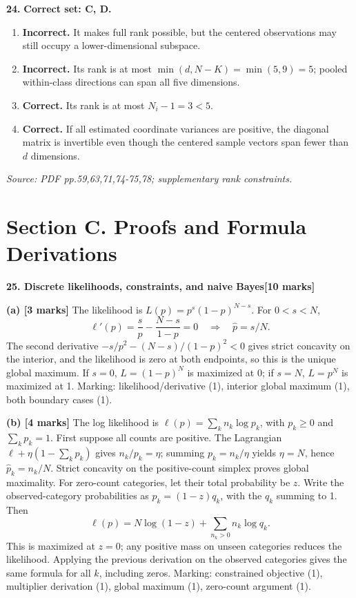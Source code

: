\documentclass[11pt,a4paper]{article}
\begin{document}
\par\noindent\begin{minipage}{\linewidth}
\textbf{24.} \textbf{Correct set: C, D.}
\begin{enumerate}[label=(\Alph*),leftmargin=8mm,itemsep=2pt,topsep=2pt]
\item \textbf{Incorrect.} It makes full rank possible, but the centered observations may still occupy a lower-dimensional subspace.
\item \textbf{Incorrect.} Its rank is at most \(\min(d,N-K)=\min(5,9)=5\); pooled within-class directions can span all five dimensions.
\item \textbf{Correct.} Its rank is at most \(N_i-1=3<5\).
\item \textbf{Correct.} If all estimated coordinate variances are positive, the diagonal matrix is invertible even though the centered sample vectors span fewer than \(d\) dimensions.
\end{enumerate}
{\footnotesize\textit{Source: PDF pp.59,63,71,74-75,78; supplementary rank constraints.}}

\end{minipage}\par\vspace{3mm}
\newpage\section*{Section C. Proofs and Formula Derivations}
\textbf{25. Discrete likelihoods, constraints, and naive Bayes}\hfill\textbf{[10 marks]}\par\medskip
\textbf{(a) [3 marks]} The likelihood is \(L(p)=p^s(1-p)^{N-s}\). For \(0<s<N\),
\[
\ell'(p)=\frac{s}{p}-\frac{N-s}{1-p}=0
\quad\Longrightarrow\quad \hat p=s/N.
\]
The second derivative \(-s/p^2-(N-s)/(1-p)^2<0\) gives strict concavity on the interior, and the likelihood is zero at both endpoints, so this is the unique global maximum. If \(s=0\), \(L=(1-p)^N\) is maximized at 0; if \(s=N\), \(L=p^N\) is maximized at 1. Marking: likelihood/derivative (1), interior global maximum (1), both boundary cases (1).

\textbf{(b) [4 marks]} The log likelihood is \(\ell(p)=\sum_kn_k\log p_k\), with \(p_k\ge0\) and \(\sum_kp_k=1\). First suppose all counts are positive. The Lagrangian \(\ell+\eta(1-\sum_kp_k)\) gives \(n_k/p_k=\eta\); summing \(p_k=n_k/\eta\) yields \(\eta=N\), hence \(\hat p_k=n_k/N\). Strict concavity on the positive-count simplex proves global maximality. For zero-count categories, let their total probability be \(z\). Write the observed-category probabilities as \(p_k=(1-z)q_k\), with the \(q_k\) summing to 1. Then
\[
\ell(p)=N\log(1-z)+\sum_{n_k>0}n_k\log q_k.
\]
This is maximized at \(z=0\); any positive mass on unseen categories reduces the likelihood. Applying the previous derivation on the observed categories gives the same formula for all \(k\), including zeros. Marking: constrained objective (1), multiplier derivation (1), global maximum (1), zero-count argument (1).
\end{document}
